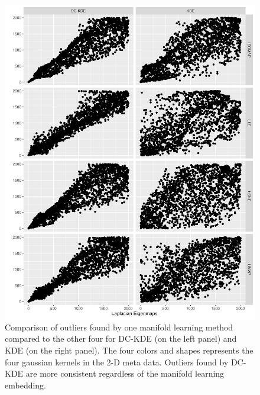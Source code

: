 \documentclass[11pt,a4paper,]{article}
\begin{document}
\begin{figure}

{\centering \includegraphics[width=0.95\linewidth]{figures/Twin Peak2000_density_compare_levs4ml_radius8_r0_5_rank} 

}

\caption{Comparison of outliers found by one manifold learning method compared to the other four for DC-KDE (on the left panel) and KDE (on the right panel). The four colors and shapes represents the four gaussian kernels in the 2-D meta data. Outliers found by DC-KDE are more consistent regardless of the manifold learning embedding.}\label{fig:tpllevs4ml-2}
\end{figure}
\end{document}
